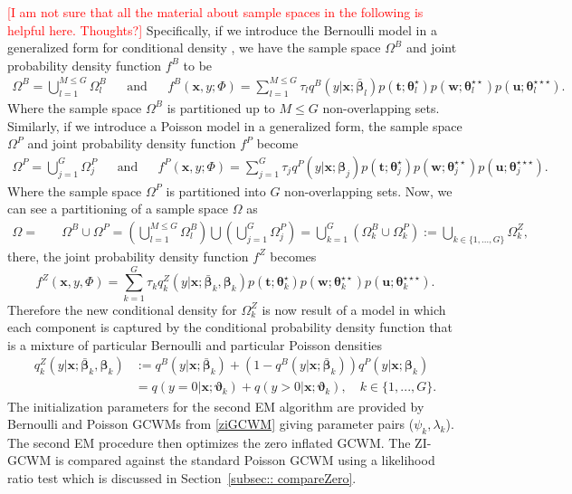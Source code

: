 \documentclass[11pt,letterpaper]{article}
\numberwithin{equation}{section}
\numberwithin{equation}{section}
\numberwithin{equation}{section}
\begin{document}
	 \textcolor{red}{[I am not sure that all the material about sample spaces in the following is helpful here. Thoughts?]} Specifically, if we introduce the Bernoulli model in a generalized form for conditional density \citep[see][]{Ingrassia+Punzo+Vittadini+Minotti:2015}, we have the sample space $\Omega^B$ and joint probability density function $f^B$ to be \begin{align*}
\Omega^B =  \bigcup_{l =1}^{M \leq G}  \Omega_l^B & & \text{and} &  &
f^B(\bm x, y; \Phi)= \sum_{l=1}^{M \leq G} \tau_l q^B(y|\bm{x}; \bm{\bar{\beta}}_l) p(\bm{t};\bm{\theta}_l^{\star})p(\bm{w};\bm{\theta}_l^{\star\star})p(\bm{u};\bm{\theta}_l^{\star\star\star}).
\end{align*}
Where the sample space $\Omega^B$ is partitioned up to $M \leq G$ non-overlapping sets.
Similarly, if we introduce a Poisson model in a generalized form, the sample space $\Omega^P$ and joint probability density function $f^P$ become
\begin{align*}
\Omega^P =  \bigcup_{j =1}^{G} \Omega_j^P & & \text{and} &  &
f^P(\bm x, y; \Phi)= \sum_{j=1}^{G} \tau_j q^P(y|\bm{x};\bm{\beta}_{j}) p(\bm{t};\bm{\theta}_j^{\star})p(\bm{w};\bm{\theta}_j^{\star\star})p(\bm{u};\bm{\theta}_j^{\star\star\star}).
\end{align*}
Where the sample space $\Omega^P$ is partitioned into  $G$ non-overlapping sets.
 Now, we can see a partitioning of a sample space $\Omega$ as
 \begin{align*}
  \Omega = & \quad \Omega^B \cup \Omega^P  =  \left(  \bigcup_{l=1}^{M\leq G} \Omega^B_l \right) \bigcup \left( \bigcup_{j=1}^G \Omega^P_j  \right) = \bigcup^G_{k = 1} \left(\Omega_k^B \cup \Omega_k^P \right) :=  \bigcup_{k \in \{ 1, ..., G  \} } \Omega_k^Z,
 \end{align*}
there, the joint probability density function $f^Z$ becomes
 $$f^Z(\bm{x},y,\Phi) = \sum_{k=1}^{G} \tau_k q^Z_{k}(y|\bm{x};  \bm{\bar{\beta}}_k,\bm{ \beta}_k)  p(\bm{t};\bm{\theta}_k^{\star})p(\bm{w};\bm{\theta}_k^{\star\star})p(\bm{u};\bm{\theta}_k^{\star\star\star}). $$  Therefore the new conditional density for $\Omega^Z_k$ is now result of a model in which each component is captured by the conditional probability density function that is a mixture of particular Bernoulli and particular Poisson densities
\begin{align}
q^Z_{k}(y|\bm{x};  \bm{\bar{\beta}}_k,\bm{ \beta}_k) & := q^B(y|\bm{x}; \bm{\bar{\beta}}_k) +(1-  q^B(y|\bm{x}; \bm{\bar{\beta}}_k) ) q^P(y|\bm{x};\bm{\beta}_k) \nonumber \\
& = q(y = 0|\bm{x};\bm{\vartheta}_{k} ) +  q(y > 0|\bm{x} ; \bm{\vartheta}_{k}), \quad k \in \{ 1, ..., G  \}.
\label{ziGCWM}
\end{align}
The initialization parameters for the second EM algorithm are provided by Bernoulli and Poisson GCWMs from \eqref{ziGCWM} giving parameter pairs ($ \psi_k,\lambda_k  $). The second EM procedure then optimizes the zero inflated GCWM. The ZI-GCWM is compared against the standard Poisson GCWM using a likelihood ratio test which is discussed in Section~\ref{subsec:: compareZero}.
\end{document}
